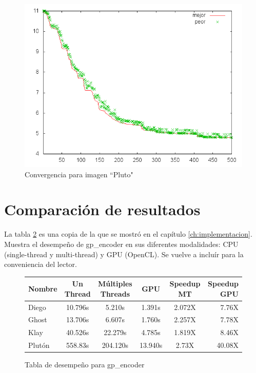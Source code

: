 \begin{figure}[b]
    \includegraphics[width=1.0\textwidth]{plot_pluto}
    \caption{Convergencia para imagen ``Pluto"}
    \label{img:plot-pluto}
\end{figure}

\section{Comparación de resultados}

La tabla \ref{table:perf_table} es una copia de la que se mostró en el capítulo
\ref{ch:implementacion}. Muestra el desempeño de gp\_encoder en sus diferentes
modalidades: CPU (single-thread y multi-thread) y GPU (OpenCL). Se vuelve a
incluír para la conveniencia del lector.

\begin{figure}[h!]
    \begin{tabular}{ |l c c c c r| }
        \hline
        Nombre &  Un Thread & Múltiples Threads & GPU & Speedup MT & Speedup GPU \\
        \hline
        Diego & 10.796s & 5.210s & 1.391s  & 2.072X & 7.76X \\
        Ghost & 13.706s & 6.607s & 1.760s  & 2.257X & 7.78X \\
        Klay & 40.526s & 22.279s & 4.785s  & 1.819X & 8.46X \\%
        Plutón & 558.83s & 204.120s & 13.940s & 2.73X & 40.08X \\ %
        \hline
    \end{tabular}
    \caption{Tabla de desempeño para gp\_encoder}
    \label{table:perf_table}
\end{figure}

